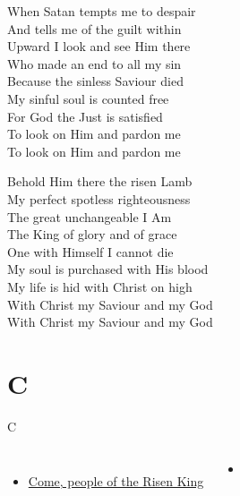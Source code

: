 \documentclass{beamer}
\begin{document}
{\begin{frame}{}
When Satan tempts me to despair\\ 
And tells me of the guilt within\\ 
Upward I look and see Him there\\ 
Who made an end to all my sin\\ 
Because the sinless Saviour died\\ 
My sinful soul is counted free\\ 
For God the Just is satisfied\\ 
To look on Him and pardon me\\ 
To look on Him and pardon me 

\end{frame}

\hypertarget{Before the throne of God above[]3}{}
\begin{frame}{}
\fontsize{ 15 }{ 19 }\selectfont

Behold Him there the risen Lamb\\ 
My perfect spotless righteousness\\ 
The great unchangeable I Am\\ 
The King of glory and of grace\\ 
One with Himself I cannot die\\ 
My soul is purchased with His blood\\ 
My life is hid with Christ on high\\ 
With Christ my Saviour and my God\\ 
With Christ my Saviour and my God 

\end{frame}

}
 
\section{C}

\begin{frame}[t]{C}
\begin{columns}[t]
        \begin{itemize}
    \item \hyperlink{Come, people of the Risen King[]}{Come, people of the Risen King } \phantom{ 1 1}
\end{itemize}
        \begin{itemize}
            \item[] \phantom{1}\end{itemize}


\end{columns}

\end{frame}
\end{document}
